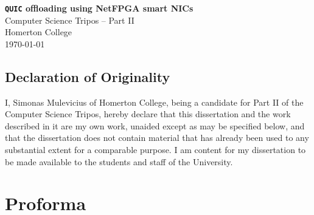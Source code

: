 \documentclass[12pt,a4paper,twoside,openright]{report}
\begin{document}





\pagestyle{empty}


\vspace*{60mm}
\begin{center}
\Huge
\textbf{\texttt{QUIC} offloading using NetFPGA smart NICs} \\[5mm]
Computer Science Tripos -- Part II \\[5mm]
Homerton College \\[5mm]
\today  %
\end{center}








\newpage



\section*{Declaration of Originality}

I, Simonas Mulevicius of Homerton College, being a candidate for Part II of the Computer
Science Tripos, hereby declare
that this dissertation and the work described in it are my own work,
unaided except as may be specified below, and that the dissertation
does not contain material that has already been used to any substantial
extent for a comparable purpose. I am content for my dissertation to
be made available to the students and staff of the University.

\bigskip
{}

\medskip
{}


\newpage











\pagestyle{plain}

\chapter*{Proforma}
\end{document}
